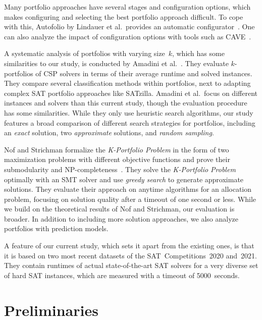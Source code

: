 \documentclass[runningheads]{llncs}
\begin{document}
Many portfolio approaches have several stages and configuration options, which makes configuring and selecting the best portfolio approach difficult.
To cope with this, Autofolio by Lindauer et al.\ provides an automatic configurator~\cite{lindauer2015autofolio}.
One can also analyze the impact of configuration options with tools such as CAVE~\cite{biedenkapp2018cave}.

A systematic analysis of portfolios with varying size~$k$, which has some similarities to our study, is conducted by Amadini et al.~\cite{amadini2014empirical,amadini2016extensive}.
They evaluate $k$-portfolios of CSP solvers in terms of their average runtime and solved instances. 
They compare several classification methods within portfolios, next to adapting complex SAT portfolio approaches like SATzilla. 
Amadini et al.\ focus on different instances and solvers than this current study, though the evaluation procedure has some similarities.
While they only use heuristic search algorithms, our study features a broad comparison of different search strategies for portfolios, including an \emph{exact} solution, two \emph{approximate} solutions, and \emph{random sampling}. 

Nof and Strichman formalize the \emph{K-Portfolio Problem} in the form of two maximization problems with different objective functions and prove their submodularity and NP-completeness~\cite{nof2020real}. 
They solve the \emph{K-Portfolio Problem} optimally with an SMT solver and use \emph{greedy search} to generate approximate solutions.
They evaluate their approach on anytime algorithms for an allocation problem, focusing on solution quality after a timeout of one second or less. 
While we build on the theoretical results of Nof and Strichman, our evaluation is broader. 
In addition to including more solution approaches, we also analyze portfolios with prediction models.

A feature of our current study, which sets it apart from the existing ones, is that it is based on two most recent datasets of the SAT~Competitions~2020 and~2021. 
They contain runtimes of actual state-of-the-art SAT solvers for a very diverse set of hard SAT instances, which are measured with a timeout of 5000~seconds.

\section{Preliminaries}
\label{sec:preliminaries}
\end{document}
